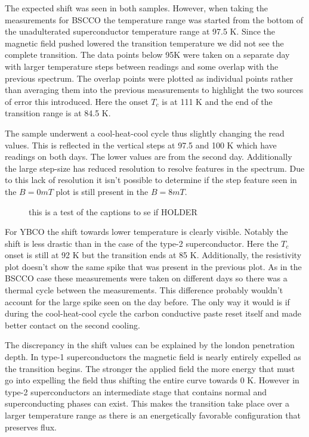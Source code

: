 \documentclass[
reprint,
amsmath,amssymb,
aps,
tikz,
border=5pt
]{revtex4-1}
\begin{document}
    The expected shift was seen in both samples. However, when taking the measurements for BSCCO the temperature range was  started from the bottom of the unadulterated superconductor temperature range at 97.5 K. Since the magnetic field pushed lowered the transition temperature we did not see the complete transition. The data points below 95K were taken on a separate day with larger temperature steps between readings and some overlap with the previous spectrum. The overlap points were plotted as individual points rather than averaging them into the previous measurements to highlight the two sources of error this introduced. Here the onset $T_c$ is at 111 K and the end of the transition range is at 84.5 K. 
    
    The sample underwent a cool-heat-cool cycle thus slightly changing the read values. This is reflected in the vertical steps at 97.5 and 100 K which have readings on both days. The lower values are from the second day. Additionally the large step-size has reduced resolution to resolve features in the spectrum. Due to this lack of resolution it isn't possible to determine if the step feature seen in the $B=0mT$ plot is still present in the $B=8mT$.


    \begin{figure}[t]
      \resizebox{0.45\textwidth}{!}{}
        \caption{this is a test of the captions to se if  HOLDER}
        \label{fig:ybco_mag}
    \end{figure}
  
    For YBCO the shift towards lower temperature is clearly visible. Notably the shift is less drastic than in the case of the type-2 superconductor. Here the $T_c$ onset is still at 92 K but the transition ends at 85 K. Additionally, the resistivity plot doesn't show the same spike that was present in the previous plot. As in the BSCCO case these measurements were taken on different days so there was a thermal cycle between the measurements. This difference probably wouldn't account for the large spike seen on the day before. The only way it would is if during the cool-heat-cool cycle the carbon conductive paste reset itself and made better contact on the second cooling.
    
    The discrepancy in the shift values can be explained by the london penetration depth. In type-1 superconductors the magnetic field is nearly entirely expelled as the transition begins. The stronger the applied field the more energy that must go into expelling the field thus shifting the entire curve towards 0 K. However in type-2 superconductors an intermediate stage that contains normal and superconducting phases can exist. This  makes the transition take place over a larger temperature range as there is an energetically favorable configuration that preserves flux.
  
\end{document}
